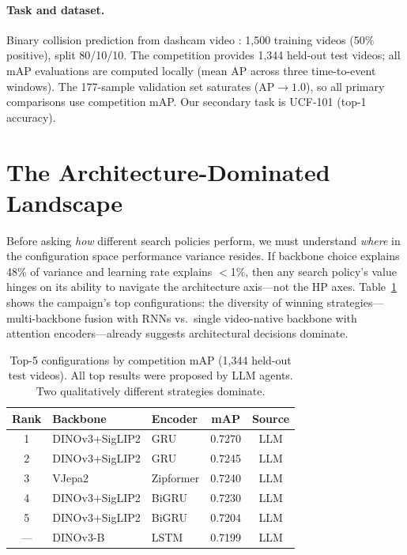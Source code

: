 \documentclass{article}
\begin{document}
\paragraph{Task and dataset.}
Binary collision prediction from dashcam video \citep{nexar2024, nexar2025}: 1{,}500 training videos (50\% positive), split 80/10/10. The competition provides 1{,}344 held-out test videos; all mAP evaluations are computed locally (mean AP across three time-to-event windows). The 177-sample validation set saturates ($\text{AP} \to 1.0$), so all primary comparisons use competition mAP. Our secondary task is UCF-101 \citep{soomro2012ucf101} (top-1 accuracy).


\section{The Architecture-Dominated Landscape}
\label{sec:anova}

Before asking \emph{how} different search policies perform, we must understand \emph{where} in the configuration space performance variance resides. If backbone choice explains 48\% of variance and learning rate explains $<$1\%, then any search policy's value hinges on its ability to navigate the architecture axis---not the HP axes.
Table~\ref{tab:top5} shows the campaign's top configurations: the diversity of winning strategies---multi-backbone fusion with RNNs vs.\ single video-native backbone with attention encoders---already suggests architectural decisions dominate.

\begin{table}[t]
\centering
\caption{Top-5 configurations by competition mAP (1{,}344 held-out test videos). All top results were proposed by LLM agents. Two qualitatively different strategies dominate.}
\label{tab:top5}
\small
\begin{tabular}{@{}cllcc@{}}
\toprule
Rank & Backbone & Encoder & mAP & Source \\
\midrule
1 & DINOv3+SigLIP2 & GRU & 0.7270 & LLM \\
2 & DINOv3+SigLIP2 & GRU & 0.7245 & LLM \\
3 & VJepa2 & Zipformer & 0.7240 & LLM \\
4 & DINOv3+SigLIP2 & BiGRU & 0.7230 & LLM \\
5 & DINOv3+SigLIP2 & BiGRU & 0.7204 & LLM \\
\midrule
--- & DINOv3-B & LSTM & 0.7199 & LLM \\
\bottomrule
\end{tabular}
\end{table}
\end{document}
